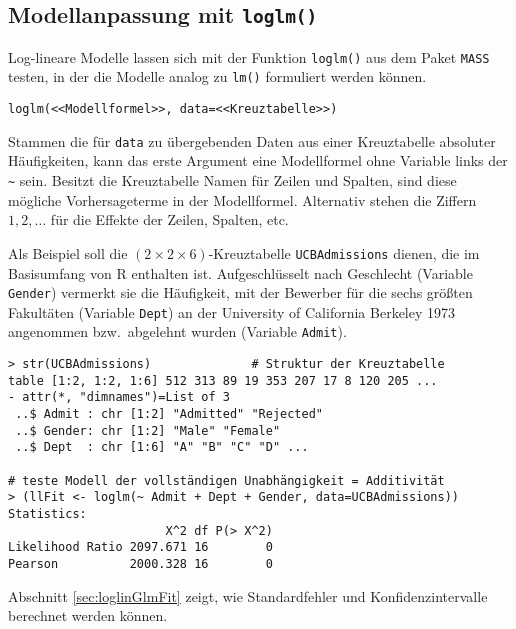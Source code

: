 \subsection{Modellanpassung mit \texttt{loglm()}}
\label{sec:loglinFit}

Log-lineare Modelle lassen sich mit der Funktion  \lstinline!loglm()! aus dem Paket  \lstinline!MASS! testen, in der die Modelle analog zu \lstinline!lm()! formuliert werden können.
\begin{lstlisting}
loglm(<<Modellformel>>, data=<<Kreuztabelle>>)
\end{lstlisting}

Stammen die für \lstinline!data! zu übergebenden Daten aus einer Kreuztabelle absoluter Häufigkeiten, kann das erste Argument eine Modellformel ohne Variable links der \lstinline!~! sein. Besitzt die Kreuztabelle Namen für Zeilen und Spalten, sind diese mögliche Vorhersageterme in der Modellformel. Alternativ stehen die Ziffern $1, 2, \ldots$ für die Effekte der Zeilen, Spalten, etc.

Als Beispiel soll die $(2 \times 2 \times 6)$-Kreuztabelle \lstinline!UCBAdmissions! dienen, die im Basisumfang von R enthalten ist. Aufgeschlüsselt nach Geschlecht (Variable \lstinline!Gender!) vermerkt sie die Häufigkeit, mit der Bewerber für die sechs größten Fakultäten (Variable \lstinline!Dept!) an der University of California Berkeley 1973 angenommen bzw.\ abgelehnt wurden (Variable \lstinline!Admit!).
\begin{lstlisting}
> str(UCBAdmissions)              # Struktur der Kreuztabelle
table [1:2, 1:2, 1:6] 512 313 89 19 353 207 17 8 120 205 ...
- attr(*, "dimnames")=List of 3
 ..$ Admit : chr [1:2] "Admitted" "Rejected"
 ..$ Gender: chr [1:2] "Male" "Female"
 ..$ Dept  : chr [1:6] "A" "B" "C" "D" ...

# teste Modell der vollständigen Unabhängigkeit = Additivität
> (llFit <- loglm(~ Admit + Dept + Gender, data=UCBAdmissions))
Statistics:
                      X^2 df P(> X^2)
Likelihood Ratio 2097.671 16        0
Pearson          2000.328 16        0
\end{lstlisting}

Abschnitt \ref{sec:loglinGlmFit} zeigt, wie Standardfehler und Konfidenzintervalle berechnet werden können.

